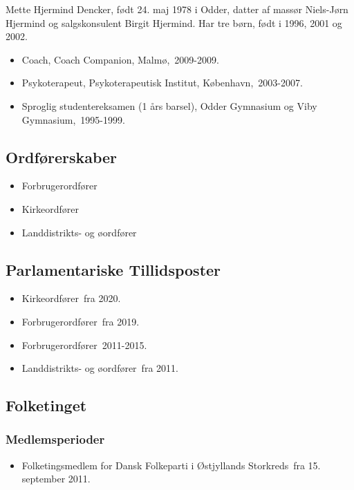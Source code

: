 \documentclass[11pt, a4paper]{awesome-cv}
\begin{document}
\makecvheader[R]
\makelettertitle
\begin{cvletter}
Mette Hjermind Dencker, født 24. maj 1978 i Odder, datter af massør Niels-Jørn Hjermind og salgskonsulent Birgit Hjermind. Har tre børn, født i 1996, 2001 og 2002.

\begin{itemize}
\item Coach, Coach Companion, Malmø, 2009-2009.
\item Psykoterapeut, Psykoterapeutisk Institut, København, 2003-2007.
\item Sproglig studentereksamen (1 års barsel), Odder Gymnasium og Viby Gymnasium, 1995-1999.
\end{itemize}
\subsection*{Ordførerskaber}
\begin{itemize}
\item Forbrugerordfører
\item Kirkeordfører
\item Landdistrikts- og øordfører
\end{itemize}
\subsection*{Parlamentariske Tillidsposter}
\begin{itemize}
\item Kirkeordfører fra 2020.
\item Forbrugerordfører fra 2019.
\item Forbrugerordfører 2011-2015.
\item Landdistrikts- og øordfører fra 2011.
\end{itemize}
\subsection*{Folketinget}
\subsubsection*{Medlemsperioder}
\begin{itemize}
\item Folketingsmedlem for Dansk Folkeparti i Østjyllands Storkreds fra 15. september 2011.
\end{itemize}

\end{cvletter}
\end{document}
